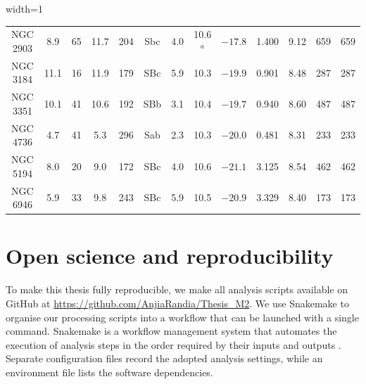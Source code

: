 \begin{table}[htbp]
\begin{adjustbox}{width=1\textwidth}
\begin{tabular}{|ccccccccccccc|}
			NGC 2903 & 8.9 & 65 & 11.7 & 204 & Sbc &4.0& 10.6$^a$ & $-17.8$ &1.400& 9.12 & 659 & 659 \\
			NGC 3184 & 11.1 & 16 & 11.9 & 179 & SBc &5.9& 10.3 & $-19.9$ &0.901& 8.48 & 287 & 287 \\
			NGC 3351 & 10.1 & 41 & 10.6 & 192 & SBb &3.1& 10.4 & $-19.7$ &0.940& 8.60 & 487 & 487 \\
			NGC 4736 & 4.7 & 41 & 5.3 & 296 & Sab &2.3& 10.3 & $-20.0$ &0.481& 8.31 & 233 & 233 \\
			NGC 5194 & 8.0 & 20 & 9.0 & 172 & SBc &4.0& 10.6 & $-21.1$ &3.125& 8.54 & 462 & 462 \\
			NGC 6946 & 5.9 & 33 & 9.8 & 243 & SBc &5.9& 10.5 & $-20.9$ &3.329& 8.40 & 173 & 173 \\
			\hline\hline
			
			
			
		\end{tabular}
		
	\end{adjustbox}
	\label{tab:galaxy_sample}
\end{table}

\clearpage
\section[Open science and reproducibility]{Open science and reproducibility}
\label{sec:reproducibility}

To make this thesis fully reproducible, we make all analysis scripts available on GitHub at \url{https://github.com/AnjiaRandia/Thesis_M2}. We use Snakemake to organise our processing scripts into a workflow that can be launched with a single command. Snakemake is a workflow management system that automates the execution of analysis steps in the order required by their inputs and outputs \citep{Molder2021}. Separate configuration files record the adopted analysis settings, while an environment file lists the software dependencies.

